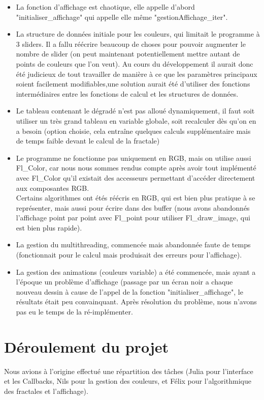 \documentclass[a4paper,11pt]{article} \usepackage[T1]{fontenc} \usepackage[utf8]{inputenc} \usepackage[francais]{babel}
\begin{document}
\begin{itemize}
  \item La fonction d'affichage est chaotique, elle appelle d'abord "initialiser\_affichage" qui appelle elle même "gestionAffichage\_iter".%

  \item La structure de données initiale pour les couleurs, qui limitait le programme à 3 sliders. Il a fallu réécrire beaucoup de choses pour pouvoir augmenter le nombre de slider (on peut maintenant potentiellement mettre autant de points de couleurs que l'on veut). Au cours du développement il aurait donc été judicieux de tout travailler de manière à ce que les paramètres principaux soient facilement modifiables,une solution aurait été d'utiliser des fonctions intermédiaires entre les fonctions de calcul et les structures de données.
  \item Le tableau contenant le dégradé n'est pas alloué dynamiquement, il faut soit utiliser un très grand tableau en variable globale, soit recalculer dès qu'on en a besoin (option choisie, cela entraîne quelques calculs supplémentaire mais de temps faible devant le calcul de la fractale)
  \item Le programme ne fonctionne pas uniquement en RGB, mais on utilise aussi Fl\_Color, car nous nous sommes rendus compte après avoir tout implémenté avec Fl\_Color qu'il existait des accesseurs permettant d’accéder directement aux composantes RGB.\\
Certains algorithmes ont étés réécris en RGB, qui est bien plus pratique à se représenter, mais aussi pour écrire dans des buffer (nous avons abandonnés l'affichage point par point avec Fl\_point pour utiliser Fl\_draw\_image, qui est bien plus rapide).
  \item La gestion du multithreading, commencée mais abandonnée faute de temps (fonctionnait pour le calcul mais produisait des erreurs pour l'affichage).
  \item La gestion des animations (couleurs variable) a été commencée, mais ayant a l'époque un problème d'affichage (passage par un écran noir a chaque nouveau dessin à cause de l'appel de la fonction "initialiser\_affichage", le résultats était peu convainquant. Après résolution du problème, nous n'avons pas eu le temps de la ré-implémenter.
\end{itemize}


\section{Déroulement du projet}
Nous avions à l'origine effectué une répartition des tâches (Julia pour l'interface et les Callbacks, Nils pour la gestion des couleurs, et Félix pour l'algorithmique des fractales et l'affichage).\\
\end{document}
